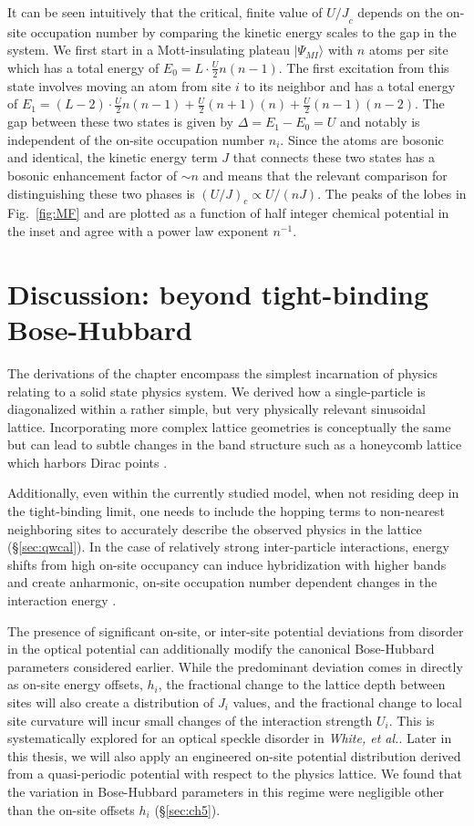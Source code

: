 It can be seen intuitively that the critical, finite value of ${U/J}_c$ depends on the on-site occupation number by comparing the kinetic energy scales to the gap in the system. We first start in a Mott-insulating plateau $|\Psi_{MI} \rangle$ with $n$ atoms per site which has a total energy of $E_0=L\cdot \frac{U}{2} n (n-1)$. The first excitation from this state involves moving an atom from site $i$ to its neighbor and has a total energy of $E_1 = (L-2) \cdot \frac{U}{2} n (n-1) + \frac{U}{2}(n+1)(n) + \frac{U}{2}(n-1)(n-2)$. The gap between these two states is given by $\Delta = E_1 - E_0 = U$ and notably is independent of the on-site occupation number $n_i$. Since the atoms are bosonic and identical, the kinetic energy term $J$ that connects these two states has a bosonic enhancement factor of $\sim n$ and means that the relevant comparison for distinguishing these two phases is $(U/J)_c \propto U/(n J)$. The peaks of the lobes in Fig.~\ref{fig:MF} and are plotted as a function of half integer chemical potential in the inset and agree with a power law exponent $n^{-1}$.

\section{Discussion: beyond tight-binding Bose-Hubbard}

The derivations of the chapter encompass the simplest incarnation of physics relating to a solid state physics system. We derived how a single-particle is diagonalized within a rather simple, but very physically relevant sinusoidal lattice. Incorporating more complex lattice geometries is conceptually the same but can lead to subtle changes in the band structure such as a honeycomb lattice which harbors Dirac points \cite{Geim2007}.

Additionally, even within the currently studied model, when not residing deep in the tight-binding limit, one needs to include the hopping terms to non-nearest neighboring sites to accurately describe the observed physics in the lattice \cite{Preiss2015,Preiss2015QW} (\S \ref{sec:qwcal}). In the case of relatively strong inter-particle interactions, energy shifts from high on-site occupancy can induce hybridization with higher bands and create anharmonic, on-site occupation number dependent changes in the interaction energy \cite{Ma2014}.

The presence of significant on-site, or inter-site potential deviations from disorder in the optical potential can additionally modify the canonical Bose-Hubbard parameters considered earlier. While the predominant deviation comes in directly as on-site energy offsets, $h_i$, the fractional change to the lattice depth between sites will also create a distribution of $J_i$ values, and the fractional change to local site curvature will incur small changes of the interaction strength $U_i$. This is systematically explored for an optical speckle disorder in \emph{White, et al.}\cite{White2009}. Later in this thesis, we will also apply an engineered on-site potential distribution derived from a quasi-periodic potential with respect to the physics lattice. We found that the variation in Bose-Hubbard parameters in this regime were negligible other than the on-site offsets $h_i$ (\S \ref{sec:ch5}).

